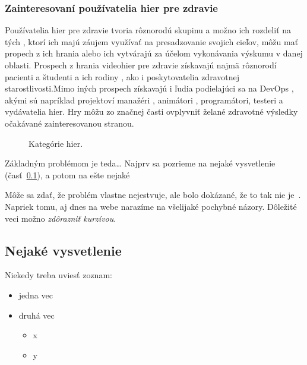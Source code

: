\documentclass[10pt,oneside,slovak,a4paper]{article}
\begin{document}
\subsubsection{Zainteresovaní používatelia hier pre zdravie}
Používatelia hier pre zdravie tvoria rôznorodú skupinu a možno ich rozdeliť na tých , ktorí ich majú záujem využívať na presadzovanie svojich cieľov, môžu mať propech z ich hrania alebo ich vytvárajú za účelom vykonávania výskumu v danej oblasti. Prospech z hrania videohier pre zdravie získavajú najmä rôznorodí pacienti a študenti a ich rodiny , ako i poskytovatelia zdravotnej starostlivosti.Mimo iných prospech získavajú i ľudia podielajúci sa na DevOps , akými sú napríklad projektoví manažéri , animátori , programátori, testeri a vydávatelia hier. Hry môžu zo značnej časti ovplyvniť želané zdravotné výsledky očakávané zainteresovanou stranou.
\begin{figure}[tbh]
\centering
\caption{Kategórie hier.}
\label{f:rozhod}
\end{figure}




Základným problémom je teda\ldots{} Najprv sa pozrieme na nejaké vysvetlenie (časť~\ref{ina:nejake}), a potom na ešte nejaké %

Môže sa zdať, že problém vlastne nejestvuje, ale bolo dokázané, že to tak nie je~. Napriek tomu, aj dnes na webe narazíme na všelijaké pochybné názory. Dôležité veci možno \emph{zdôrazniť kurzívou}.


\subsection{Nejaké vysvetlenie} \label{ina:nejake}
\cite{Coplien:MPD}
Niekedy treba uviesť zoznam:

\begin{itemize}
\item jedna vec
\item druhá vec
	\begin{itemize}
	\item x
	\item y
	\end{itemize}
\end{itemize}
\end{document}
